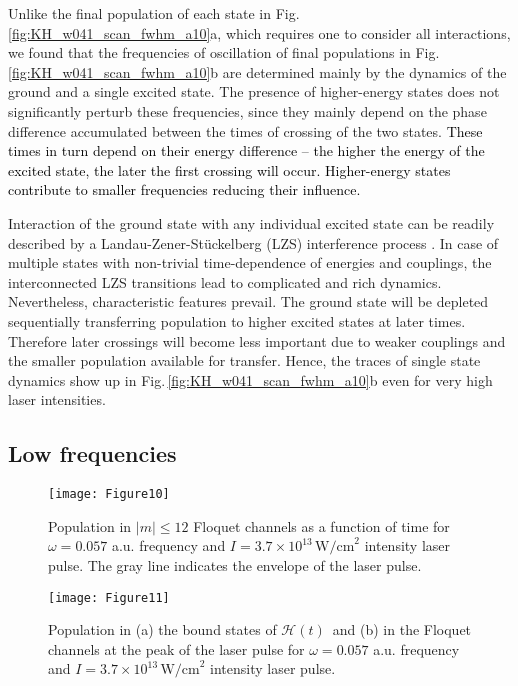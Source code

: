 \documentclass[
pra%
,preprint%
,amssymb, nobibnotes, aps, superscriptaddress, floatfix]{revtex4}
\newcommand{\fig}{Fig.\,}
\newcommand{\CAHt}{$\mathcal{H}(t)$}
\newcommand{\editt}[1]{\textcolor{black}{#1}}
\begin{document}
Unlike the final population of each state in \fig  \ref{fig:KH_w041_scan_fwhm_a10}a, which requires one to consider all interactions, we found that the frequencies of oscillation of final populations in \fig \ref{fig:KH_w041_scan_fwhm_a10}b are determined mainly by the dynamics of the ground and a single excited state.
The presence of higher-energy states does not significantly perturb these frequencies, since they mainly depend on  the phase difference accumulated between the times of crossing of the two states. 
\editt{
These times in turn depend on their energy difference -- the higher the energy of the excited state, the later the first crossing will occur. Higher-energy states contribute to smaller frequencies reducing their influence. 
}

Interaction of the ground state with any individual excited state can be readily described by a Landau-Zener-St\"{u}ckelberg (LZS) interference process \cite{Schafer1997a, Shevchenko2010}. In case of multiple states with non-trivial time-dependence of energies and couplings, the interconnected LZS transitions lead to complicated and rich dynamics. Nevertheless, characteristic features prevail. The ground state will be depleted sequentially transferring population to higher excited states at later times. Therefore later crossings will become less important due to weaker couplings and the smaller population available for transfer. Hence, the traces of single state dynamics show up in \fig \ref{fig:KH_w041_scan_fwhm_a10}b even for very high laser intensities.


\subsection{Low frequencies} \label{sec:low_freq}

\begin{figure}
\centering
\texttt{[image: Figure10]}
\caption{Population in $|m| \leq 12$ Floquet channels as a function of time for $\omega=0.057$ a.u.  frequency and $I=3.7 \times 10^{13} \, \text{W/cm}^2$  intensity laser pulse. The gray line indicates the envelope of the laser pulse.}
\label{fig:Floquet_w005_30fs_a10}
\end{figure}



\begin{figure*}
\centering
\texttt{[image: Figure11]}
\caption{Population in (a) the bound states of \CAHt\ and (b) in the Floquet channels at the peak of the laser pulse for $\omega=0.057$ a.u. frequency and $I=3.7 \times 10^{13} \, \text{W/cm}^2$ intensity laser pulse.}
\label{fig:low_freq_combined}
\end{figure*}
\end{document}
